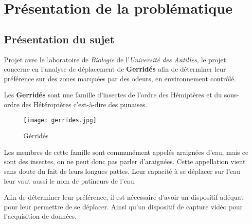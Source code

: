 \chapter{Présentation de la problématique}
    \section{Présentation du sujet}
    Projet avec le laboratoire de \textit{Biologie} de l'\textit{Université des Antilles}, le projet concerne en l'analyse de déplacement de \textbf{Gerridés} afin de déterminer leur préférence sur des zones marquées par des odeurs, en environnement contrôlé.

    \vspace{0.5cm}

    Les \textbf{Gerridés} sont une famille d'insectes de l'ordre des Hémiptères et du sous-ordre des Hétéroptères c'est-à-dire des punaises.
    \begin{figure}[h]
        \centering
        \texttt{[image: gerrides.jpg]}
        \caption{Gérridés}        
    \end{figure}

    \vspace{0.1cm}

    \begin{flushleft}
        Les membres de cette famille sont communément appelés araignées d’eau, mais ce sont des insectes, on ne peut donc pas parler d'araignées. Cette appellation vient sans doute du fait de leurs longues pattes. Leur capacité à se déplacer sur l'eau leur vaut aussi le nom de patineurs de l'eau.        
    \end{flushleft}

    \vspace{0.5cm}

    Afin de déterminer leur préférence, il est nécessaire d'avoir un dispositif adéquat pour leur permettre de se déplacer.
    Ainsi qu'un dispositif de capture vidéo pour l'acquisition de données.

    \vspace{1.6cm}

